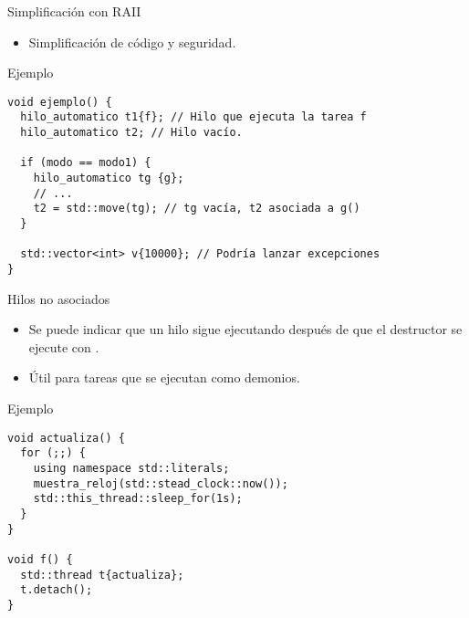 \begin{frame}[fragile]{Simplificación con RAII}
\begin{itemize}
  \item Simplificación de código y seguridad.
\end{itemize}
\begin{block}{Ejemplo}
\begin{lstlisting}
void ejemplo() {
  hilo_automatico t1{f}; // Hilo que ejecuta la tarea f
  hilo_automatico t2; // Hilo vacío.

  if (modo == modo1) {
    hilo_automatico tg {g}; 
    // ...
    t2 = std::move(tg); // tg vacía, t2 asociada a g()
  }

  std::vector<int> v{10000}; // Podría lanzar excepciones
}
\end{lstlisting}
\end{block}
\end{frame}

\begin{frame}[fragile]{Hilos no asociados}
\begin{itemize}
  \item Se puede indicar que un hilo sigue ejecutando después de que el destructor se ejecute con .
  \item Útil para tareas que se ejecutan como demonios.
\end{itemize}
\begin{block}{Ejemplo}
\begin{lstlisting}
void actualiza() {
  for (;;) {
    using namespace std::literals;
    muestra_reloj(std::stead_clock::now());
    std::this_thread::sleep_for(1s);
  }
}

void f() {
  std::thread t{actualiza};
  t.detach();
}
\end{lstlisting}
\end{block}
\end{frame}

